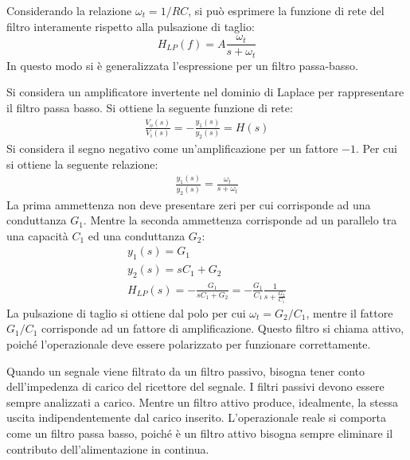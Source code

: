 \documentclass{article}
\numberwithin{equation}{subsection}
\begin{document}
Considerando la relazione $\omega_t=1/RC$, si può esprimere la funzione di rete del filtro interamente rispetto alla pulsazione di taglio:
\begin{equation}
    H_{LP}(f)=A\displaystyle\frac{\omega_t}{s+\omega_t}
\end{equation}
In questo modo si è generalizzata l'espressione per un filtro passa-basso. 

Si considera un amplificatore invertente nel dominio di Laplace per rappresentare il filtro passa basso. 
Si ottiene la seguente funzione di rete:
\begin{gather*}
    \displaystyle\frac{V_o(s)}{V_i(s)}=-\frac{y_1(s)}{y_2(s)}=H(s)
\end{gather*}
Si considera il segno negativo come un'amplificazione per un fattore $-1$. 
Per cui si ottiene la seguente relazione:
\begin{gather*}
    \displaystyle\frac{y_1(s)}{y_2(s)}=\frac{\omega_t}{s+\omega_t}
\end{gather*}
La prima ammettenza non deve presentare zeri per cui corrisponde ad una conduttanza $G_1$. Mentre la seconda ammettenza corrisponde ad un parallelo tra una capacità $C_1$ 
ed una conduttanza $G_2$:
\begin{gather*}
    y_1(s)=G_1\\
    y_2(s)=sC_1+G_2\\
    H_{LP}(s)=-\displaystyle\frac{G_1}{sC_1+G_2}=-\frac{G_1}{C_1}\frac{1}{s+\displaystyle\frac{G_2}{C_1}}
\end{gather*}
La pulsazione di taglio si ottiene dal polo per cui $\omega_t=G_2/C_1$, mentre il fattore $G_1/C_1$ corrisponde ad un fattore di amplificazione. 
Questo filtro si chiama attivo, poiché l'operazionale deve essere polarizzato per funzionare correttamente. 

Quando un segnale viene filtrato da un filtro passivo, bisogna tener conto dell'impedenza di carico del ricettore del segnale. I filtri passivi devono essere sempre 
analizzati a carico. Mentre un filtro attivo produce, idealmente, la stessa uscita indipendentemente dal carico inserito. L'operazionale reale si comporta come un 
filtro passa basso, poiché è un filtro attivo bisogna sempre eliminare il contributo dell'alimentazione in continua. 
\end{document}
